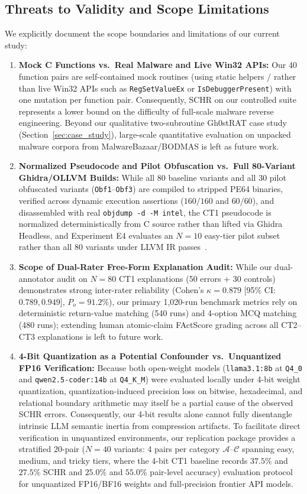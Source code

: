 \documentclass[runningheads]{llncs}
\begin{document}
\subsection{Threats to Validity and Scope Limitations}
\label{sec:threats}
We explicitly document the scope boundaries and limitations of our current study:
\begin{enumerate}
    \item \textbf{Mock C Functions vs.\ Real Malware and Live Win32 APIs:} Our 40 function pairs are self-contained mock routines (using static helpers / rather than live Win32 APIs such as \texttt{RegSetValueEx} or \texttt{IsDebuggerPresent}) with one mutation per function pair. Consequently, SCHR on our controlled suite represents a lower bound on the difficulty of full-scale malware reverse engineering. Beyond our qualitative two-subroutine Gh0stRAT case study (Section~\ref{sec:case_study}), large-scale quantitative evaluation on unpacked malware corpora from MalwareBazaar/BODMAS is left as future work.
    \item \textbf{Normalized Pseudocode and Pilot Obfuscation vs.\ Full 80-Variant Ghidra/OLLVM Builds:} While all 80 baseline variants and all 30 pilot obfuscated variants (\texttt{Obf1}--\texttt{Obf3}) are compiled to stripped PE64 binaries, verified across dynamic execution assertions ($160/160$ and $60/60$), and disassembled with real \texttt{objdump -d -M intel}, the CT1 pseudocode is normalized deterministically from C source rather than lifted via Ghidra Headless, and Experiment E4 evaluates an $N=10$ easy-tier pilot subset rather than all 80 variants under LLVM IR passes~\cite{junod2015ollvm}.
    \item \textbf{Scope of Dual-Rater Free-Form Explanation Audit:} While our dual-annotator audit on $N=80$ CT1 explanations (50 errors + 30 controls) demonstrates strong inter-rater reliability (Cohen's $\kappa = 0.879$ [95\% CI: $0.789, 0.949$], $P_o = 91.2\%$), our primary 1,020-run benchmark metrics rely on deterministic return-value matching (540 runs) and 4-option MCQ matching (480 runs); extending human atomic-claim FActScore grading across all CT2--CT3 explanations is left to future work.
    \item \textbf{4-Bit Quantization as a Potential Confounder vs.\ Unquantized FP16 Verification:} Because both open-weight models (\texttt{llama3.1:8b} at \texttt{Q4\_0} and \texttt{qwen2.5-coder:14b} at \texttt{Q4\_K\_M}) were evaluated locally under 4-bit weight quantization, quantization-induced precision loss on bitwise, hexadecimal, and relational boundary arithmetic may itself be a partial cause of the observed SCHR errors. Consequently, our 4-bit results alone cannot fully disentangle intrinsic LLM semantic inertia from compression artifacts. To facilitate direct verification in unquantized environments, our replication package provides a stratified 20-pair ($N=40$ variants: 4 pairs per category $\mathcal{A}$--$\mathcal{C}$ spanning easy, medium, and tricky tiers, where the 4-bit CT1 baseline records $37.5\%$ and $27.5\%$ SCHR and $25.0\%$ and $55.0\%$ pair-level accuracy) evaluation protocol for unquantized FP16/BF16 weights and full-precision frontier API models.

\end{enumerate}
\end{document}
